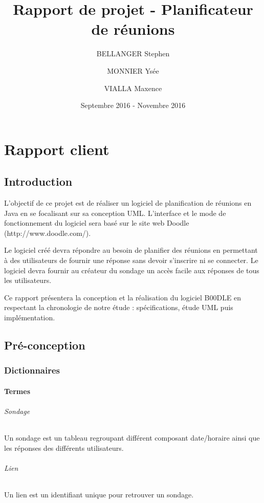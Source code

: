 \documentclass[titlepage]{report}
\title{Rapport de projet - Planificateur de réunions}
\author{BELLANGER Stephen \and
			MONNIER Ysée \and
			VIALLA Maxence}
\date{Septembre 2016 - Novembre 2016}
\begin{document}
	
	\maketitle


\tableofcontents

\listoffigures 
\part{Rapport client}

\chapter{Introduction}

\par
L'objectif de ce projet est de réaliser un logiciel de planification de réunions en Java en se focalisant sur sa conception UML. 
L'interface et le mode de fonctionnement du logiciel sera basé sur le site web Doodle (http://www.doodle.com/). 
\par
Le logiciel créé devra répondre au besoin de planifier des réunions en permettant à des utilisateurs de fournir une réponse sans devoir s'inscrire ni se connecter. 
Le logiciel devra fournir au créateur du sondage un accès facile aux réponses de tous les utilisateurs.
\par
Ce rapport présentera la conception et la réalisation du logiciel B00DLE en respectant la chronologie de notre étude : spécifications, étude UML puis implémentation.



\chapter{Pré-conception}

\section{Dictionnaires}
\subsection{Termes}
\paragraph{Sondage} Un sondage est un tableau regroupant différent composant date/horaire ainsi que les réponses des différents utilisateurs.
\paragraph{Lien} Un lien est un identifiant unique pour retrouver un sondage.
\end{document}

